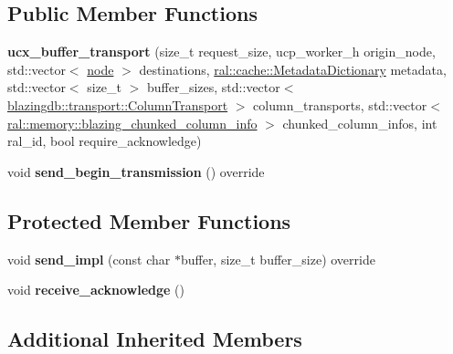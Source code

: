 \subsection*{Public Member Functions}
\begin{DoxyCompactItemize}
\item 
\mbox{\label{classcomm_1_1ucx__buffer__transport_a7892303af5ac173623795aeeeccc9f3b}} 
{\bfseries ucx\+\_\+buffer\+\_\+transport} (size\+\_\+t request\+\_\+size, ucp\+\_\+worker\+\_\+h origin\+\_\+node, std\+::vector$<$ \hyperlink{classcomm_1_1node}{node} $>$ destinations, \hyperlink{classral_1_1cache_1_1MetadataDictionary}{ral\+::cache\+::\+Metadata\+Dictionary} metadata, std\+::vector$<$ size\+\_\+t $>$ buffer\+\_\+sizes, std\+::vector$<$ \hyperlink{structblazingdb_1_1transport_1_1ColumnTransport}{blazingdb\+::transport\+::\+Column\+Transport} $>$ column\+\_\+transports, std\+::vector$<$ \hyperlink{structral_1_1memory_1_1blazing__chunked__column__info}{ral\+::memory\+::blazing\+\_\+chunked\+\_\+column\+\_\+info} $>$ chunked\+\_\+column\+\_\+infos, int ral\+\_\+id, bool require\+\_\+acknowledge)
\item 
\mbox{\label{classcomm_1_1ucx__buffer__transport_aa90d59aa020a7575f3af559a5d431fbf}} 
void {\bfseries send\+\_\+begin\+\_\+transmission} () override
\end{DoxyCompactItemize}
\subsection*{Protected Member Functions}
\begin{DoxyCompactItemize}
\item 
\mbox{\label{classcomm_1_1ucx__buffer__transport_aae9fff646e4addce7092d5f043513a44}} 
void {\bfseries send\+\_\+impl} (const char $\ast$buffer, size\+\_\+t buffer\+\_\+size) override
\item 
\mbox{\label{classcomm_1_1ucx__buffer__transport_a2940abea65cd4a031ef92350255c6c53}} 
void {\bfseries receive\+\_\+acknowledge} ()
\end{DoxyCompactItemize}
\subsection*{Additional Inherited Members}


